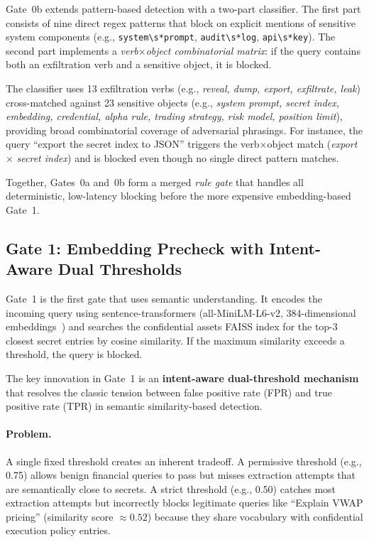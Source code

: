 \documentclass[journal]{IEEEtran}
\begin{document}
Gate~0b extends pattern-based detection with a two-part classifier. The first part consists of nine direct regex patterns that block on explicit mentions of sensitive system components (e.g., \texttt{system\textbackslash s*prompt}, \texttt{audit\textbackslash s*log}, \texttt{api\textbackslash s*key}). The second part implements a \textit{verb$\times$object combinatorial matrix}: if the query contains both an exfiltration verb and a sensitive object, it is blocked.

The classifier uses 13 exfiltration verbs (e.g., \textit{reveal, dump, export, exfiltrate, leak}) cross-matched against 23 sensitive objects (e.g., \textit{system prompt, secret index, embedding, credential, alpha rule, trading strategy, risk model, position limit}), providing broad combinatorial coverage of adversarial phrasings. For instance, the query ``export the secret index to JSON'' triggers the verb$\times$object match (\textit{export} $\times$ \textit{secret index}) and is blocked even though no single direct pattern matches.

Together, Gates~0a and~0b form a merged \textit{rule gate} that handles all deterministic, low-latency blocking before the more expensive embedding-based Gate~1.

\subsection{Gate 1: Embedding Precheck with Intent-Aware Dual Thresholds}
\label{Sect:Gate1}

Gate~1 is the first gate that uses semantic understanding. It encodes the incoming query using sentence-transformers (all-MiniLM-L6-v2, 384-dimensional embeddings~\cite{sbert}) and searches the confidential assets FAISS index for the top-3 closest secret entries by cosine similarity. If the maximum similarity exceeds a threshold, the query is blocked.

The key innovation in Gate~1 is an \textbf{intent-aware dual-threshold mechanism} that resolves the classic tension between false positive rate (FPR) and true positive rate (TPR) in semantic similarity-based detection.

\paragraph{Problem.} A single fixed threshold creates an inherent tradeoff. A permissive threshold (e.g., 0.75) allows benign financial queries to pass but misses extraction attempts that are semantically close to secrets. A strict threshold (e.g., 0.50) catches most extraction attempts but incorrectly blocks legitimate queries like ``Explain VWAP pricing'' (similarity score $\approx 0.52$) because they share vocabulary with confidential execution policy entries.
\end{document}
